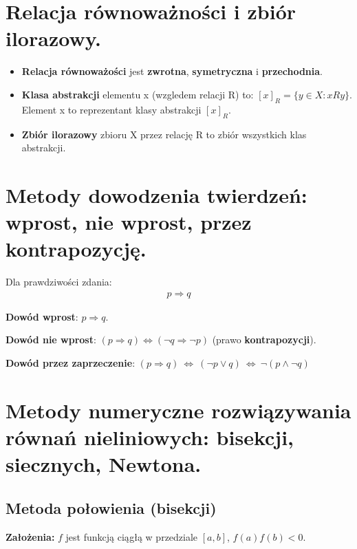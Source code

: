 \documentclass[main.tex]{subfiles}
\begin{document}
    \section{Relacja równoważności i zbiór ilorazowy.}

    \begin{itemize}
        \item \textbf{Relacja równoważości} jest \textbf{zwrotna}, \textbf{symetryczna} i \textbf{przechodnia}.

        \item \textbf{Klasa abstrakcji} elementu x (wzgledem relacji R) to: $[x]_{R} = \{y \in X: xRy\}$. Element x to
        reprezentant klasy abstrakcji $[x]_{R}$.

        \item \textbf{Zbiór ilorazowy} zbioru X przez relację R to zbiór wszystkich klas abstrakcji.
    \end{itemize}


    \section{Metody dowodzenia twierdzeń: wprost, nie wprost, przez kontrapozycję.}

    Dla prawdziwości zdania:
    \begin{align*}
        p \Rightarrow q
    \end{align*}

    \textbf{Dowód wprost}: $ p \Rightarrow q$.

    \textbf{Dowód nie wprost}: $(p \Rightarrow q) \Leftrightarrow (\neg q \Rightarrow \neg p)$ (prawo \textbf{kontrapozycji}).

    \textbf{Dowód przez zaprzeczenie}: $(p \Rightarrow q) ~ \Leftrightarrow ~ (\neg p \vee q) ~ \Leftrightarrow ~ \neg(p \wedge \neg q)$


    \section{Metody numeryczne rozwiązywania równań nieliniowych: bisekcji, siecznych, Newtona.}

    \subsection{Metoda połowienia (bisekcji)}

    \textbf{Założenia:} $f$ jest funkcją ciągłą w przedziale $[a,b]$, $f(a)f(b) < 0$.
\end{document}
